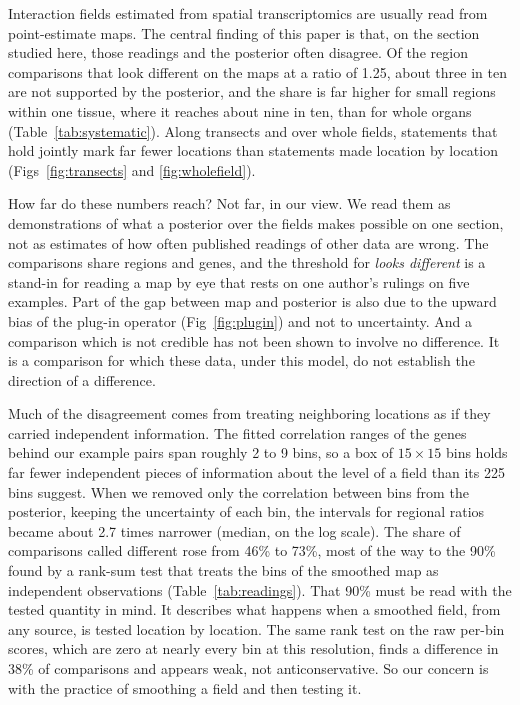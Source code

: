 \documentclass[10pt,letterpaper]{article}
\begin{document}
Interaction fields estimated from spatial transcriptomics are usually read from point-estimate maps. The central finding of this paper is that, on the section studied here, those readings and the posterior often disagree. Of the region comparisons that look different on the maps at a ratio of 1.25, about three in ten are not supported by the posterior, and the share is far higher for small regions within one tissue, where it reaches about nine in ten, than for whole organs (Table~\ref{tab:systematic}). Along transects and over whole fields, statements that hold jointly mark far fewer locations than statements made location by location (Figs~\ref{fig:transects} and \ref{fig:wholefield}).

How far do these numbers reach? Not far, in our view. We read them as demonstrations of what a posterior over the fields makes possible on one section, not as estimates of how often published readings of other data are wrong. The comparisons share regions and genes, and the threshold for \textit{looks different} is a stand-in for reading a map by eye that rests on one author's rulings on five examples. Part of the gap between map and posterior is also due to the upward bias of the plug-in operator (Fig~\ref{fig:plugin}) and not to uncertainty. And a comparison which is not credible has not been shown to involve no difference. It is a comparison for which these data, under this model, do not establish the direction of a difference.

Much of the disagreement comes from treating neighboring locations as if they carried independent information. The fitted correlation ranges of the genes behind our example pairs span roughly 2 to 9 bins, so a box of $15\times15$ bins holds far fewer independent pieces of information about the level of a field than its 225 bins suggest. When we removed only the correlation between bins from the posterior, keeping the uncertainty of each bin, the intervals for regional ratios became about 2.7 times narrower (median, on the log scale). The share of comparisons called different rose from 46\% to 73\%, most of the way to the 90\% found by a rank-sum test that treats the bins of the smoothed map as independent observations (Table~\ref{tab:readings}). That 90\% must be read with the tested quantity in mind. It describes what happens when a smoothed field, from any source, is tested location by location. The same rank test on the raw per-bin scores, which are zero at nearly every bin at this resolution, finds a difference in 38\% of comparisons and appears weak, not anticonservative. So our concern is with the practice of smoothing a field and then testing it.
\end{document}
